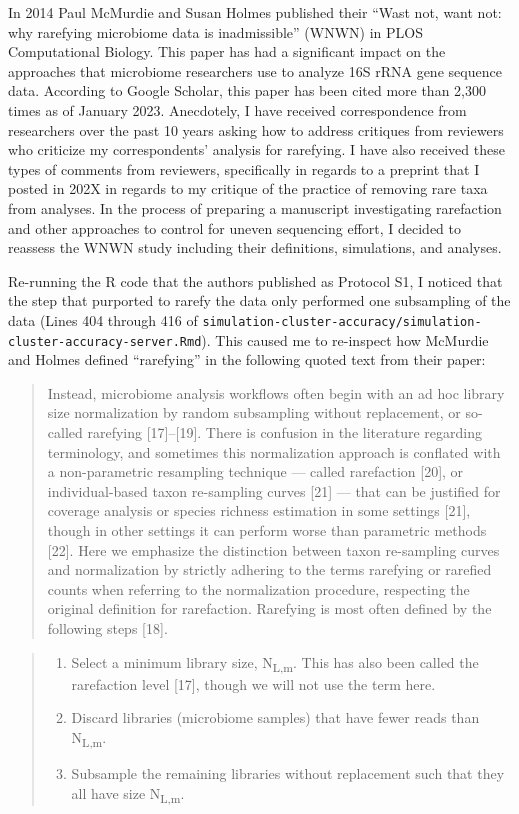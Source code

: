 \documentclass[
]{article}
\providecommand{\tightlist}{%
  \setlength{\itemsep}{0pt}\setlength{\parskip}{0pt}}
\begin{document}
In 2014 Paul McMurdie and Susan Holmes published their ``Wast not, want
not: why rarefying microbiome data is inadmissible'' (WNWN) in PLOS
Computational Biology. This paper has had a significant impact on the
approaches that microbiome researchers use to analyze 16S rRNA gene
sequence data. According to Google Scholar, this paper has been cited
more than 2,300 times as of January 2023. Anecdotely, I have received
correspondence from researchers over the past 10 years asking how to
address critiques from reviewers who criticize my correspondents'
analysis for rarefying. I have also received these types of comments
from reviewers, specifically in regards to a preprint that I posted in
202X in regards to my critique of the practice of removing rare taxa
from analyses. In the process of preparing a manuscript investigating
rarefaction and other approaches to control for uneven sequencing
effort, I decided to reassess the WNWN study including their
definitions, simulations, and analyses.

Re-running the R code that the authors published as Protocol S1, I
noticed that the step that purported to rarefy the data only performed
one subsampling of the data (Lines 404 through 416 of
\texttt{simulation-cluster-accuracy/simulation-cluster-accuracy-server.Rmd}).
This caused me to re-inspect how McMurdie and Holmes defined
``rarefying'' in the following quoted text from their paper:

\begin{quote}
Instead, microbiome analysis workflows often begin with an ad hoc
library size normalization by random subsampling without replacement, or
so-called rarefying {[}17{]}--{[}19{]}. There is confusion in the
literature regarding terminology, and sometimes this normalization
approach is conflated with a non-parametric resampling technique ---
called rarefaction {[}20{]}, or individual-based taxon re-sampling
curves {[}21{]} --- that can be justified for coverage analysis or
species richness estimation in some settings {[}21{]}, though in other
settings it can perform worse than parametric methods {[}22{]}. Here we
emphasize the distinction between taxon re-sampling curves and
normalization by strictly adhering to the terms rarefying or rarefied
counts when referring to the normalization procedure, respecting the
original definition for rarefaction. Rarefying is most often defined by
the following steps {[}18{]}.
\end{quote}

\begin{quote}
\begin{enumerate}
\def\labelenumi{\arabic{enumi}.}
\tightlist
\item
  Select a minimum library size, N\textsubscript{L,m}. This has also
  been called the rarefaction level {[}17{]}, though we will not use the
  term here.
\item
  Discard libraries (microbiome samples) that have fewer reads than
  N\textsubscript{L,m}.
\item
  Subsample the remaining libraries without replacement such that they
  all have size N\textsubscript{L,m}.
\end{enumerate}
\end{quote}
\end{document}
